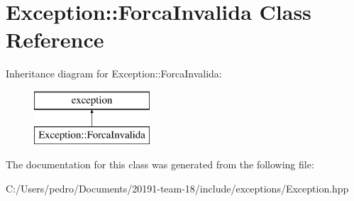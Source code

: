 \hypertarget{class_exception_1_1_forca_invalida}{}\section{Exception\+::Forca\+Invalida Class Reference}
\label{class_exception_1_1_forca_invalida}
Inheritance diagram for Exception\+::Forca\+Invalida\+:\begin{figure}[H]
\begin{center}
\leavevmode
\includegraphics[height=2.000000cm]{class_exception_1_1_forca_invalida}
\end{center}
\end{figure}


The documentation for this class was generated from the following file\+:\begin{DoxyCompactItemize}
\item 
C\+:/\+Users/pedro/\+Documents/20191-\/team-\/18/include/exceptions/Exception.\+hpp\end{DoxyCompactItemize}

